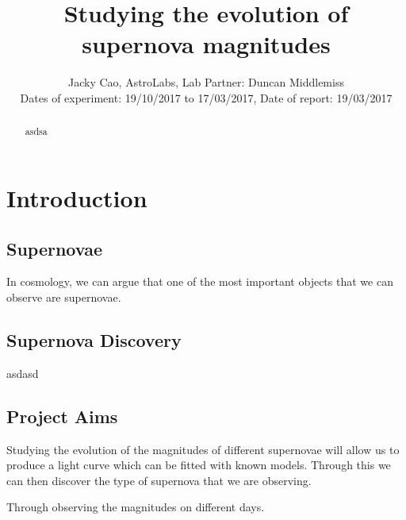 \documentclass[twocolumn]{revtex4}
\begin{document}
\textheight=26.385cm

\title{Studying the evolution of supernova magnitudes}
 
\author{Jacky Cao, AstroLabs, Lab Partner: Duncan Middlemiss \\ Dates of experiment: 19/10/2017 to 17/03/2017, Date of report: 19/03/2017}

\begin{abstract}              
asdsa
\end{abstract}

\maketitle

\vspace{-3ex}
\section{Introduction} 
\vspace{-2ex}
\subsection{Supernovae}
\vspace{-2ex}

In cosmology, we can argue that one of the most important objects that we can observe are supernovae.  

\vspace{-3ex}
\subsection{Supernova Discovery}
\vspace{-2ex}

asdasd

\vspace{-3ex}
\subsection{Project Aims}
\vspace{-2ex}

Studying the evolution of the magnitudes of different supernovae will allow us to produce a light curve which can be fitted with known models. Through this we can then discover the type of supernova that we are observing. 

Through observing the magnitudes on different days.
\end{document}
